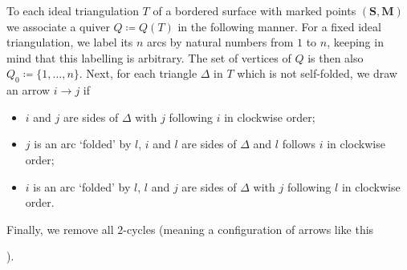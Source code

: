 \documentclass[a4paper,oneside,svgnames,draft]{amsart}
\theoremstyle{plain}
\theoremstyle{definition}
\begin{document}
 To each ideal triangulation $T$ of a bordered surface with marked points
 $(\mathbf{S},\mathbf{M})$ we associate a quiver $Q \coloneqq Q(T)$ in the
 following manner. For a fixed ideal triangulation, we label its $n$ arcs by
 natural numbers from $1$ to $n$, keeping in mind that this labelling is
 arbitrary. The set of vertices of $Q$ is then also $Q_0 \coloneqq
 \{1,\ldots,n\}$. Next, for each triangle $\Delta$ in $T$ which is not
 self-folded, we draw an arrow $i \to j$ if
 \begin{itemize}
  \item $i$ and $j$ are sides of $\Delta$ with $j$ following $i$ in clockwise
   order;
  \item $j$ is an arc `folded' by $l$, $i$ and $l$ are sides of $\Delta$ and $l$
   follows $i$ in clockwise order;
  \item $i$ is an arc `folded' by $l$, $l$ and $j$ are sides of $\Delta$ with
   $j$ following $l$ in clockwise order.
 \end{itemize}
 Finally, we remove all $2$-cycles (meaning a configuration of arrows like this
 ).
\end{document}
